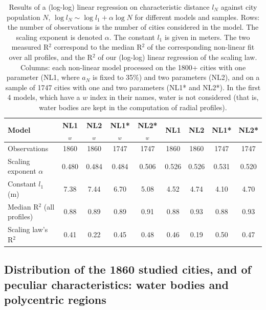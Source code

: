 \documentclass[sn-mathphys-num]{sn-jnl}%
\theoremstyle{thmstyleone}%
\theoremstyle{thmstyletwo}%
\theoremstyle{thmstylethree}%
\begin{document}
\begin{table}
\begin{tabular}{lcccccccc}
Model & NL1$_w$ & NL2$_w$ & NL1*$_w$ & NL2*$_w$ & NL1 & NL2 & NL1* & NL2* \\
\hline
Observations & 1860 & 1860 & 1747 & 1747 & 1860 & 1860 & 1747 & 1747 \\
Scaling exponent $\alpha$ & 0.480 & 0.484 & 0.484 & 0.506 & 0.526 & 0.526 & 0.531 & 0.520 \\
Constant $l_1$ (m) & 7.38 & 7.44 & 6.70 & 5.08  & 4.52 & 4.74 & 4.10 & 4.70 \\
Median R$^2$ (all profiles) & 0.88 & 0.89 & 0.89 & 0.91  & 0.88 & 0.93 & 0.88 & 0.93 \\
Scaling law's R$^2$ & 0.41 & 0.22 & 0.45 & 0.48  & 0.46 & 0.19 & 0.50 & 0.47 \\
\hline
\end{tabular}
\caption{Results of a (log-log) linear regression on characteristic distance $l_N$ against city population $N$, $\log l_N \sim \log l_1 + \alpha \log N $ for different models and samples. Rows: the number of observations is the number of cities considered in the model. The scaling exponent is denoted $\alpha$. The constant $l_1$ is given in meters. The two measured R$^2$ correspond to the median R$^2$  of the corresponding non-linear fit over all profiles, and the R$^2$ of our (log-log) linear regression of the scaling law. Columns: each non-linear model processed on the 1800+ cities with one parameter (NL1, where $a_N$ is fixed to 35\%) and two parameters (NL2), and on a sample of 1747 cities with one and two parameters (NL1* and NL2*). In the first 4 models, which have a $w$ index in their names, water is not considered (that is, water bodies are kept in the computation of radial profiles).}
\label{models}
\end{table}
\backmatter


\subsection*{Distribution of the 1860 studied cities, and of peculiar characteristics: water bodies and polycentric regions}
\end{document}
